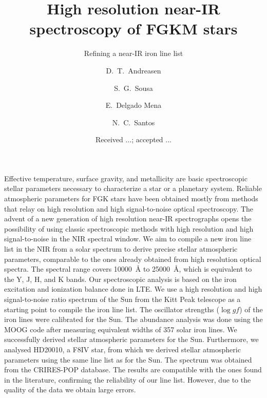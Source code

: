 \documentclass{aa}
\begin{document}
\title{High resolution near-IR spectroscopy of FGKM stars}
\subtitle{Refining a near-IR iron line list}


\author{ D.~T.~Andreasen
    \and S.~G.~Sousa
    \and E.~Delgado Mena
    \and N.~C.~Santos}







\date{Received ...; accepted ...}

\abstract
{Effective temperature, surface gravity, and metallicity are basic
spectroscopic stellar parameters necessary to characterize
a star or a planetary system. Reliable atmospheric parameters for
FGK stars have been obtained mostly from methods that relay on high
resolution and high signal-to-noise optical spectroscopy. The
advent of a new generation of high resolution near-IR spectrographs
opens the possibility of using classic spectroscopic methods with
high resolution and high signal-to-noise in the NIR spectral window.}
{We aim to compile a new iron line list in the NIR from a solar
spectrum to derive precise stellar atmospheric parameters,
comparable to the ones already obtained from high resolution optical
spectra. The spectral range covers \SI{10000}{\angstrom} to
\SI{25000}{\angstrom}, which is equivalent to the Y, J, H, and K bands.}
{Our spectroscopic analysis is based on the iron excitation and
ionization balance done in LTE. We
use a high resolution and high signal-to-noise ratio spectrum of the Sun
from the Kitt Peak telescope as a starting point to compile the iron
line list. The oscillator strengths ($\log\mathit{gf}$) of the iron lines were calibrated for the Sun.
The abundance analysis was done using
the MOOG code after measuring equivalent widths of 357 solar iron lines.}
{We successfully derived stellar atmospheric parameters for the
Sun.
Furthermore, we analysed
HD20010, a F8IV star, from which we derived stellar atmospheric
parameters using the same line list as for the Sun. The spectrum
was obtained from the CRIRES-POP database.
The results are compatible with the ones found in the literature,
confirming the reliability of our line list. However, due to the
quality of the data we obtain large errors.}
{}
\end{document}
